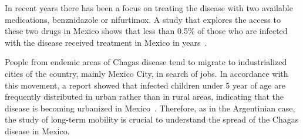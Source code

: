 In recent years there has been a focus on treating the disease with two available
medications, benznidazole or nifurtimox. A study
that explores the access to these two drugs in Mexico
shows that less than 0.5\% of those who are infected with
the disease received treatment in Mexico in years~\cite{manne2013barriers}.


People from endemic areas of Chagas disease tend to migrate to industrialized cities of the country, mainly Mexico City, in search of jobs.
In accordance with this movement, a report showed
that infected children under 5 year of age are frequently distributed in urban
rather than in rural areas, indicating that the disease is becoming urbanized in
Mexico~\cite{guzman2001epidemiology}.
Therefore, as in the Argentinian case, the study of long-term mobility is crucial to understand the spread of the Chagas disease in Mexico.






